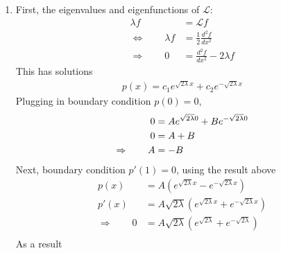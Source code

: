 \documentclass[12pt]{article}
\theoremstyle{plain}
\theoremstyle{definition}
\theoremstyle{remark}
\begin{document}
\begin{enumerate}
    \begin{enumerate}
      \item %
        First, the eigenvalues and eigenfunctions of $\mathscr{L}$:
        \begin{align*}
          \lambda f &= \mathscr{L} f\\
          \Leftrightarrow \qquad
          \lambda f &= \frac{1}{2} \frac{d^2 f}{d x^2}\\
          \Rightarrow \qquad
          0 &= \frac{d^2 f}{d x^2} -2\lambda f
        \end{align*}
        This has solutions
        \begin{align*}
          p(x) = c_1 e^{\sqrt{2\lambda} x} + c_2 e^{-\sqrt{2\lambda} x}
        \end{align*}
        Plugging in boundary condition $p(0)=0$,
        \begin{align}
          0 &= A e^{\sqrt{2\lambda} 0} + B e^{-\sqrt{2\lambda} 0} \notag\\
          0 &= A + B \notag \\
          \Rightarrow \qquad
          A &= -B \label{q3a.1}
        \end{align}
        Next, boundary condition $p'(1) = 0$, using the result above
        \begin{align*}
          p(x) &= A (e^{\sqrt{2\lambda} x} - e^{-\sqrt{2\lambda} x}) \\
          p'(x) &= A \sqrt{2\lambda} (e^{\sqrt{2\lambda} x} +  e^{-\sqrt{2\lambda} x}) \\
          \Rightarrow\qquad
          0 &=
          A \sqrt{2\lambda} (e^{\sqrt{2\lambda}} +  e^{-\sqrt{2\lambda}}) \\
        \end{align*}
        As a result
        \begin{align*}
        \end{align*}
    \end{enumerate}


\end{enumerate}
\end{document}
